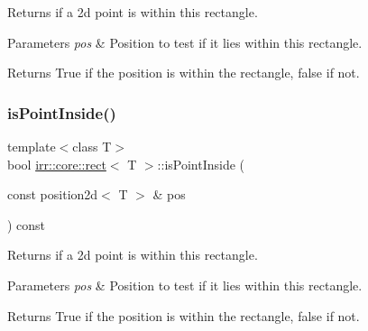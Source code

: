 Returns if a 2d point is within this rectangle. 


\begin{DoxyParams}{Parameters}
{\em pos} & Position to test if it lies within this rectangle. \\
\hline
\end{DoxyParams}
\begin{DoxyReturn}{Returns}
True if the position is within the rectangle, false if not. 
\end{DoxyReturn}
\mbox{\label{classirr_1_1core_1_1rect_a34c84ad8ff423a4b657eedbcd112afb3}} 
\subsubsection{\texorpdfstring{is\+Point\+Inside()}{isPointInside()}\hspace{0.1cm}{\footnotesize\ttfamily [2/2]}}
{\footnotesize\ttfamily template$<$class T$>$ \\
bool \hyperlink{classirr_1_1core_1_1rect}{irr\+::core\+::rect}$<$ T $>$\+::is\+Point\+Inside (\begin{DoxyParamCaption}\item[{const position2d$<$ T $>$ \&}]{pos }\end{DoxyParamCaption}) const\hspace{0.3cm}{\ttfamily [inline]}}



Returns if a 2d point is within this rectangle. 


\begin{DoxyParams}{Parameters}
{\em pos} & Position to test if it lies within this rectangle. \\
\hline
\end{DoxyParams}
\begin{DoxyReturn}{Returns}
True if the position is within the rectangle, false if not. 
\end{DoxyReturn}
\mbox{\label{classirr_1_1core_1_1rect_ab94b7d9da434c7b08761426e296c2f3e}} 

